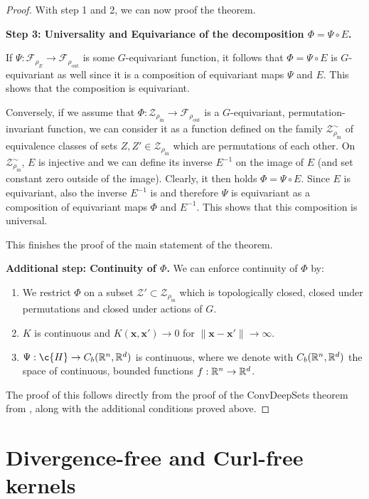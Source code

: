 \begin{proof}
	With step 1 and 2, we can now proof the theorem.

	\textbf{Step 3: Universality and Equivariance of the decomposition $\Phi=\Psi\circ E$.}

	If $\Psi:\mathcal{F}_{\rho_E}\to\mathcal{F}_{\rho_{\text{out}}}$ is some $G$-equivariant function, it follows that $\Phi=\Psi\circ E$ is $G$-equivariant as well since it is a composition of equivariant maps $\Psi$ and $E$.
	This shows that the composition is equivariant.

	Conversely, if we assume that $\Phi:\mathcal{Z}_{\rho_{\text{in}}}\to\mathcal{F}_{\rho_{\text{out}}}$ is a $G$-equivariant, permutation-invariant function, we can consider it as a function defined on the family $\mathcal{Z}_{\rho_{\text{in}}}^{\sim}$ of equivalence classes of sets $Z,Z'\in\mathcal{Z}_{\rho_{\text{in}}}$ which are permutations of each other.
	On $\mathcal{Z}_{\rho_{\text{in}}}^{\sim}$, $E$ is injective and we can define its inverse $E^{-1}$ on the image of $E$ (and set constant zero outside of the image).
	Clearly, it then holds $\Phi=\Psi\circ E$.
	Since $E$ is equivariant, also the inverse $E^{-1}$ is and therefore $\Psi$ is equivariant as a composition of equivariant maps $\Phi$ and $E^{-1}$.
	This shows that this composition is universal.

	This finishes the proof of the main statement of the theorem.

	\textbf{Additional step: Continuity of $\Phi$.}
	We can enforce continuity of $\Phi$ by: \begin{enumerate} \item We restrict $\Phi$ on a subset $\mathcal{Z}'\subset\mathcal{Z}_{\rho_{\text{in}}}$ which is topologically closed, closed under permutations and closed under actions of $G$.
		\item $K$ is continuous and $K(\mathbf{x},\mathbf{x}')\to 0$ for $\|\mathbf{x}-\mathbf{x}'\|\to \infty$.
		\item $\Psi:\c{H}\to C_b(\R^n,\R^d)$ is continuous, where we denote with $C_b(\mathbb{R}^n,\mathbb{R}^d)$  the space of continuous, bounded functions $f:\mathbb{R}^n\to\mathbb{R}^d$.
	\end{enumerate}

	The proof of this follows directly from the proof of the ConvDeepSets theorem from \textcite{ConvCNP}, along with the additional conditions proved above.
\end{proof}

\section{Divergence-free and Curl-free kernels}

